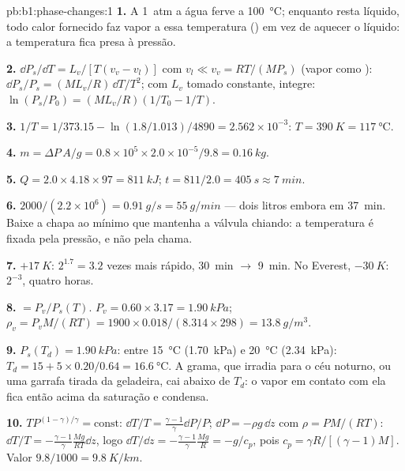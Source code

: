 \begin{solution}{pb:b1:phase-changes:1}
\textbf{1.} A \qty{1}{atm} a água ferve a \qty{100}{\degreeCelsius}; enquanto
resta líquido, todo calor fornecido faz vapor a essa temperatura
() em vez de aquecer o líquido: a temperatura fica presa
à pressão.

\textbf{2.} $\dd P_s/\dd T = L_v/[T(v_v - v_l)]$ com $v_l \ll v_v = RT/(MP_s)$
(vapor como ): $\dd P_s/P_s = (ML_v/R)\,\dd T/T^2$; com $L_v$ tomado
constante, integre: $\ln(P_s/P_0) = (ML_v/R)(1/T_0 - 1/T)$.

\textbf{3.} $1/T = 1/373.15 - \ln(1.8/1.013)/4890 = 2.562 \times 10^{-3}$: $T =
\qty{390}{K} = \qty{117}{\degreeCelsius}$.

\textbf{4.} $m = \Delta P\,A/g = 0.8 \times 10^5 \times 2.0 \times 10^{-5}/9.8 =
\qty{0.16}{kg}$.

\textbf{5.} $Q = 2.0 \times 4.18 \times 97 = \qty{811}{kJ}$; $t = 811/2.0 =
\qty{405}{s} \approx \qty{7}{min}$.

\textbf{6.} $2000/(2.2 \times 10^6) = \qty{0.91}{g/s} = \qty{55}{g/min}$ --- dois
litros embora em \qty{37}{min}. Baixe a chapa ao mínimo que
mantenha a válvula chiando: a temperatura é fixada pela pressão, e não
pela chama.

\textbf{7.} $+\qty{17}{K}$: $2^{1.7} = 3.2$ vezes mais rápido, \qty{30}{min}
$\to$ \qty{9}{min}. No Everest, $-\qty{30}{K}$: $2^{-3}$, quatro horas.

\textbf{8.}  $= P_v/P_s(T)$. $P_v = 0.60 \times 3.17 =
\qty{1.90}{kPa}$; $\rho_v = P_vM/(RT) = 1900 \times 0.018/(8.314 \times 298) =
\qty{13.8}{g/m^3}$.

\textbf{9.} $P_s(T_d) = \qty{1.90}{kPa}$: entre \qty{15}{\degreeCelsius}
(\qty{1.70}{kPa}) e \qty{20}{\degreeCelsius} (\qty{2.34}{kPa}): $T_d = 15 + 5 \times 0.20/0.64
= \qty{16.6}{\degreeCelsius}$. A grama, que irradia para o céu noturno, ou uma
garrafa tirada da geladeira, cai abaixo de $T_d$: o vapor em contato
com ela fica então acima da saturação e condensa.

\textbf{10.} $TP^{(1-\gamma)/\gamma} = \text{const}$: $\dd T/T = \frac{\gamma - 1}{\gamma}
\dd P/P$; $\dd P = -\rho g\,\dd z$ com $\rho = PM/(RT)$: $\dd T/T = -\frac{\gamma -
1}{\gamma}\frac{Mg}{RT}\dd z$, logo $\dd T/\dd z = -\frac{\gamma - 1}{\gamma}\frac{Mg}{R} =
-g/c_p$, pois $c_p = \gamma R/[(\gamma - 1)M]$. Valor $9.8/1000 = \qty{9.8}{K/km}$.


\end{solution}
